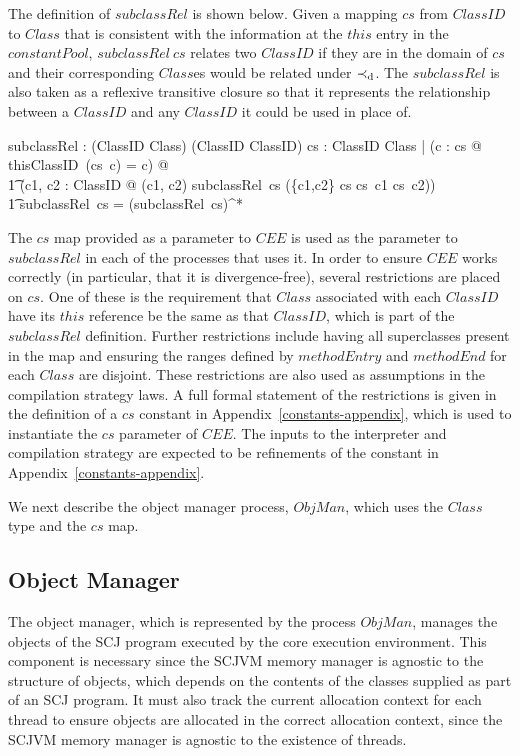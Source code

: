 The definition of $subclassRel$ is shown below.
Given a mapping $cs$ from $ClassID$ to $Class$ that is consistent with
the information at the $this$ entry in the $constantPool$,
$subclassRel~cs$ relates two $ClassID$ if they are in the domain of
$cs$ and their corresponding $Class$es would be related under
$\prec_{\mathrm{d}}$.
The $subclassRel$ is also taken as a reflexive transitive closure so
that it represents the relationship between a $ClassID$ and any
$ClassID$ it could be used in place of.
\begin{axdef}
  subclassRel : (ClassID \pfun Class) \fun (ClassID \rel ClassID)
  \where
  \forall cs : ClassID \pfun Class | (\forall c : \dom cs @ thisClassID~(cs~c) = c) @\\
  \t1 (\forall c1, c2 : ClassID @ (c1, c2) \in subclassRel~cs \iff (\{c1,c2\} \subseteq \dom cs \land cs~c1 \directsubclass cs~c2)) \\
  \t1 \land subclassRel~cs = (subclassRel~cs)^*
\end{axdef}

The $cs$ map provided as a parameter to $CEE$ is used as the parameter
to $subclassRel$ in each of the processes that uses it.
In order to ensure $CEE$ works correctly (in particular, that it is
divergence-free), several restrictions are placed on $cs$.
One of these is the requirement that $Class$ associated with each
$ClassID$ have its $this$ reference be the same as that $ClassID$,
which is part of the $subclassRel$ definition.
Further restrictions include having all superclasses present in the
map and ensuring the ranges defined by $methodEntry$ and $methodEnd$
for each $Class$ are disjoint.
These restrictions are also used as assumptions in the compilation
strategy laws.
A full formal statement of the restrictions is given in the definition
of a $cs$ constant in Appendix~\ref{constants-appendix}, which is used
to instantiate the $cs$ parameter of $CEE$.
The inputs to the interpreter and compilation strategy are expected to
be refinements of the constant in Appendix~\ref{constants-appendix}.

We next describe the object manager process, $ObjMan$, which uses the
$Class$ type and the $cs$ map.

\subsection{Object Manager}
\label{cee-object-manager-subsection}

The object manager, which is represented by the process $ObjMan$,
manages the objects of the SCJ program executed by the core execution
environment.
This component is necessary since the SCJVM memory manager is agnostic
to the structure of objects, which depends on the contents of the
classes supplied as part of an SCJ program.
It must also track the current allocation context for each thread to
ensure objects are allocated in the correct allocation context, since
the SCJVM memory manager is agnostic to the existence of threads.

